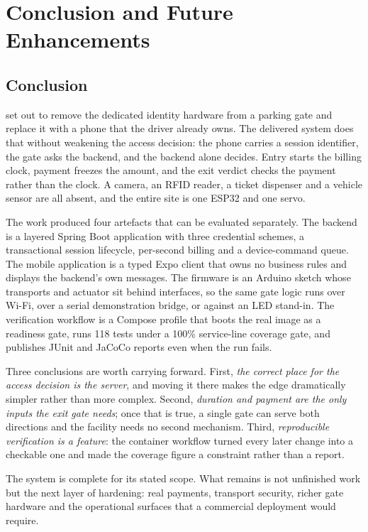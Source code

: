 \chapter{Conclusion and Future Enhancements}

\section{Conclusion}

\project{} set out to remove the dedicated identity hardware from a parking gate and
replace it with a phone that the driver already owns. The delivered system does that
without weakening the access decision: the phone carries a session identifier, the
gate asks the backend, and the backend alone decides. Entry starts the billing clock,
payment freezes the amount, and the exit verdict checks the payment rather than the
clock. A camera, an RFID reader, a ticket dispenser and a vehicle sensor are all
absent, and the entire site is one ESP32 and one servo.

The work produced four artefacts that can be evaluated separately. The backend is a
layered Spring Boot application with three credential schemes, a transactional
session lifecycle, per-second billing and a device-command queue. The mobile
application is a typed Expo client that owns no business rules and displays the
backend's own messages. The firmware is an Arduino sketch whose transports and
actuator sit behind interfaces, so the same gate logic runs over Wi-Fi, over a serial
demonstration bridge, or against an LED stand-in. The verification workflow is a
Compose profile that boots the real image as a readiness gate, runs 118 tests under a
100\% service-line coverage gate, and publishes JUnit and JaCoCo reports even when the
run fails.

Three conclusions are worth carrying forward. First, \emph{the correct place for the
access decision is the server}, and moving it there makes the edge dramatically
simpler rather than more complex. Second, \emph{duration and payment are the only
inputs the exit gate needs}; once that is true, a single gate can serve both
directions and the facility needs no second mechanism. Third, \emph{reproducible
verification is a feature}: the container workflow turned every later change into a
checkable one and made the coverage figure a constraint rather than a report.

The system is complete for its stated scope. What remains is not unfinished work but
the next layer of hardening: real payments, transport security, richer gate hardware
and the operational surfaces that a commercial deployment would require.

